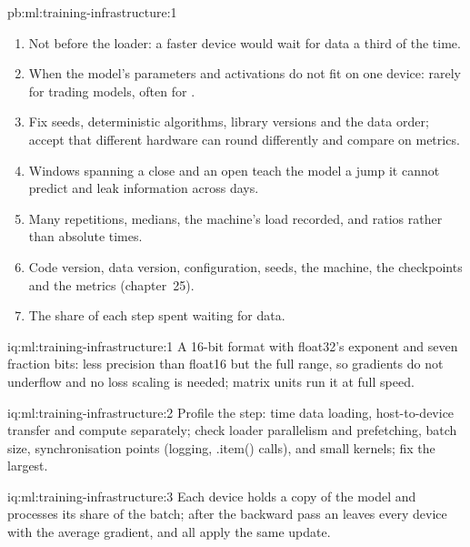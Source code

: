 \begin{solution}{pb:ml:training-infrastructure:1}
\begin{enumerate}[resume]
float32 and  over the 300-step run is 0.0132, while their final losses agree to 0.0002.
\item Not before the loader: a faster device would wait for data a third of the time.
\item When the model's parameters and activations do not fit on one device: rarely for trading models, often for .
\item Fix seeds, deterministic algorithms, library versions and the data order; accept that different hardware can round
differently and compare on metrics.
\item Windows spanning a close and an open teach the model a jump it cannot predict and leak information across days.
\item Many repetitions, medians, the machine's load recorded, and ratios rather than absolute times.
\item Code version, data version, configuration, seeds, the machine, the checkpoints and the metrics (chapter~25).
\item The share of each step spent waiting for data.
\end{enumerate}
\end{solution}

\begin{solution}{iq:ml:training-infrastructure:1}
A 16-bit format with float32's exponent and seven fraction bits: less precision than float16 but the full range, so gradients do
not underflow and no loss scaling is needed; matrix units run it at full speed.
\end{solution}

\begin{solution}{iq:ml:training-infrastructure:2}
Profile the step: time data loading, host-to-device transfer and compute separately; check loader parallelism and prefetching,
batch size, synchronisation points (logging, .item() calls), and small kernels; fix the largest.
\end{solution}

\begin{solution}{iq:ml:training-infrastructure:3}
Each device holds a copy of the model and processes its share of the batch; after the backward pass an  leaves every
device with the average gradient, and all apply the same update.
\end{solution}

